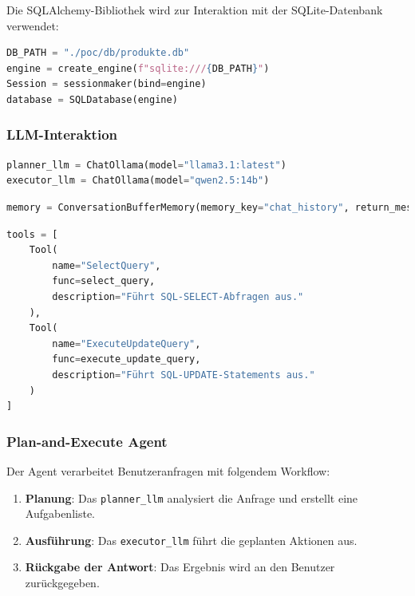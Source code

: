 Die SQLAlchemy-Bibliothek wird zur Interaktion mit der SQLite-Datenbank verwendet:
\begin{lstlisting}[language=Python, style=pythonstyle, caption={Verbindung zur SQLite-Datenbank}]
DB_PATH = "./poc/db/produkte.db"
engine = create_engine(f"sqlite:///{DB_PATH}")
Session = sessionmaker(bind=engine)
database = SQLDatabase(engine)
\end{lstlisting}

\subsubsection{LLM-Interaktion}
\begin{lstlisting}[language=Python, style=pythonstyle, caption={Initialisierung der LLMs}]
planner_llm = ChatOllama(model="llama3.1:latest")
executor_llm = ChatOllama(model="qwen2.5:14b")
\end{lstlisting}

\begin{lstlisting}[language=Python, style=pythonstyle, caption={Speicherung der Konversationshistorie}]
memory = ConversationBufferMemory(memory_key="chat_history", return_messages=True)
\end{lstlisting}

\begin{lstlisting}[language=Python, style=pythonstyle, caption={Definition der SQL-Tools}]
tools = [
    Tool(
        name="SelectQuery",
        func=select_query,
        description="Führt SQL-SELECT-Abfragen aus."
    ),
    Tool(
        name="ExecuteUpdateQuery",
        func=execute_update_query,
        description="Führt SQL-UPDATE-Statements aus."
    )
]
\end{lstlisting}

\subsubsection{Plan-and-Execute Agent}
Der Agent verarbeitet Benutzeranfragen mit folgendem Workflow:
\begin{enumerate}
    \item \textbf{Planung}: Das \texttt{planner\_llm} analysiert die Anfrage und erstellt eine Aufgabenliste.
    \item \textbf{Ausf\"uhrung}: Das \texttt{executor\_llm} f\"uhrt die geplanten Aktionen aus.
    \item \textbf{R\"uckgabe der Antwort}: Das Ergebnis wird an den Benutzer zur\"uckgegeben.
\end{enumerate}

